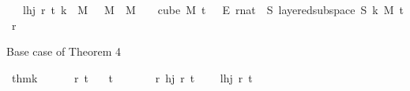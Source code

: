 \begin{isabellebody}
\ \ \ {\isachardoublequoteopen}lhj\ r\ t\ k\ {\isasymequiv}\ {\isacharparenleft}{\kern0pt}{\isasymexists}M\ {\isachargreater}{\kern0pt}\ {}{\isachardot}{\kern0pt}\ {\isasymforall}M{\isacharprime}{\kern0pt}\ {\isasymge}\ M{\isachardot}{\kern0pt}\ {\isasymforall}{\isasymchi}{\isachardot}{\kern0pt}\ {\isasymchi}\ {\isasymin}\ {\isacharparenleft}{\kern0pt}cube\ M{\isacharprime}{\kern0pt}\ {\isacharparenleft}{\kern0pt}t\ {\isacharplus}{\kern0pt}\ {}{\isacharparenright}{\kern0pt}{\isacharparenright}{\kern0pt}\ {\isasymrightarrow}\isactrlsub E\ {\isacharbraceleft}{\kern0pt}{\isachardot}{\kern0pt}{\isachardot}{\kern0pt}{\isacharless}{\kern0pt}r{\isacharcolon}{\kern0pt}{\isacharcolon}{\kern0pt}nat{\isacharbraceright}{\kern0pt}\ {\isasymlongrightarrow}\ {\isacharparenleft}{\kern0pt}{\isasymexists}S{\isachardot}{\kern0pt}\ layered{\isacharunderscore}{\kern0pt}subspace\ S\ k\ M{\isacharprime}{\kern0pt}\ t\ r\ {\isasymchi}{\isacharparenright}{\kern0pt}{\isacharparenright}{\kern0pt}{\isachardoublequoteclose}%
\begin{isamarkuptext}%
Base case of Theorem 4%
\end{isamarkuptext}\isamarkuptrue%
\isamarkupfalse%
\ thm{}{\isacharunderscore}{\kern0pt}k{\isacharunderscore}{\kern0pt}{}{\isacharcolon}{\kern0pt}\ \isanewline
\ \ \ \ \ r\ t\isanewline
\ \ \ {\isachardoublequoteopen}t\ {\isachargreater}{\kern0pt}\ {}{\isachardoublequoteclose}\isanewline
\ \ \ \ \ {\isachardoublequoteopen}{\isasymAnd}r{\isacharprime}{\kern0pt}{\isachardot}{\kern0pt}\ hj\ r{\isacharprime}{\kern0pt}\ t{\isachardoublequoteclose}\ \isanewline
\ \ \ {\isachardoublequoteopen}lhj\ r\ t\ {}{\isachardoublequoteclose}\isanewline
%
\isadelimproof
\isanewline
%
\endisadelimproof
%
\isatagproof
{}\isamarkupfalse%
{\isacharminus}{\kern0pt}\isanewline
\ \ \isamarkupfalse%

\end{isabellebody}
